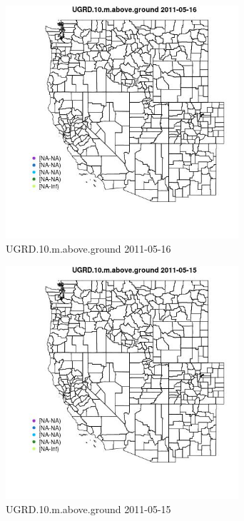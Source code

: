 \begin{figure} 
\centering  
\includegraphics[width=0.77\textwidth]{Code_Outputs/ML_input_report_ML_input_PM25_Step5_part_d_de_duplicated_aves_ML_input_MapObsUGRD10maboveground2011-05-16.jpg} 
\caption{\label{fig:ML_input_report_ML_input_PM25_Step5_part_d_de_duplicated_aves_ML_inputMapObsUGRD10maboveground2011-05-16}UGRD.10.m.above.ground 2011-05-16} 
\end{figure} 
 

\begin{figure} 
\centering  
\includegraphics[width=0.77\textwidth]{Code_Outputs/ML_input_report_ML_input_PM25_Step5_part_d_de_duplicated_aves_ML_input_MapObsUGRD10maboveground2011-05-15.jpg} 
\caption{\label{fig:ML_input_report_ML_input_PM25_Step5_part_d_de_duplicated_aves_ML_inputMapObsUGRD10maboveground2011-05-15}UGRD.10.m.above.ground 2011-05-15} 
\end{figure} 
 

